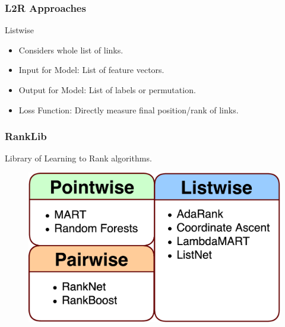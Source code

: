 \begin{frame}
  \frametitle{L2R Approaches}
  \begin{block}{Listwise}
   	\begin{itemize}
    	\item Considers whole list of links.
    	\item Input for Model: List of feature vectors.
    	\item Output for Model: List of labels or permutation.
    	\item Loss Function: Directly measure final position/rank of links.
	  \end{itemize}
    \end{block}
\end{frame}

\begin{frame}
  \frametitle{RankLib}
  \centering
  	Library of Learning to Rank algorithms.
  \begin{figure}[tbph]
    \centering
    \includegraphics[width=0.7\linewidth]{images/RankLib}
  \end{figure}
\end{frame}


